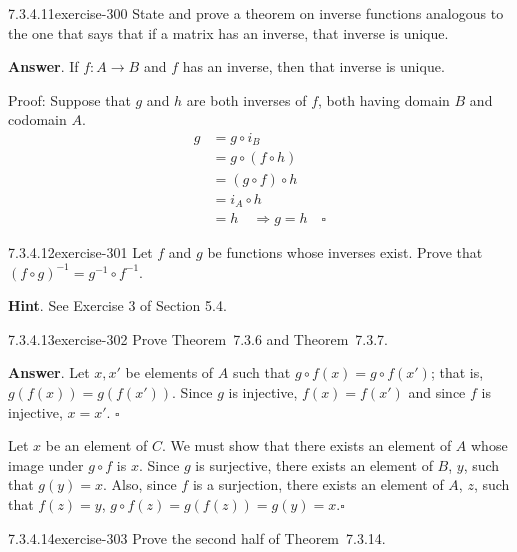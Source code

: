 \documentclass[twoside,10pt,]{book}
\numberwithin{equation}{section}
\begin{document}
\begin{divisionsolution}{7.3.4.11}{}{exercise-300}%
\hypertarget{p-2506}{}%
State and prove a theorem on inverse functions analogous to the one that says that if a matrix has an inverse, that inverse is unique.%
\par\smallskip%
\noindent\textbf{Answer}.\quad%
\hypertarget{p-2507}{}%
If \(f:A\to B\) and \(f\) has an inverse, then that inverse is unique.%
\par
\hypertarget{p-2508}{}%
Proof:  Suppose that \(g\) and \(h\) are both inverses of \(f\), both having domain \(B\) and codomain \(A\).%
\begin{equation*}
\begin{split}g &= g\circ i_B \\
& =g\circ (f\circ h)\\
& =(g\circ f)\circ h\\
& =i_A\circ h\\
& =h\quad \Rightarrow g=h \quad \square
\end{split}
\end{equation*}
%
\end{divisionsolution}%
\begin{divisionsolution}{7.3.4.12}{}{exercise-301}%
\hypertarget{p-2509}{}%
Let \(f\) and \(g\) be functions whose inverses exist. Prove that \((f\circ g)^{-1}= g^{-1}\circ f^{-1}\).%
\par\smallskip%
\noindent\textbf{Hint}.\quad%
\hypertarget{p-2510}{}%
See Exercise 3 of Section 5.4.%
\end{divisionsolution}%
\begin{divisionsolution}{7.3.4.13}{}{exercise-302}%
\hypertarget{p-2511}{}%
Prove Theorem~7.3.6 and Theorem~7.3.7.%
\par\smallskip%
\noindent\textbf{Answer}.\quad%
\hypertarget{p-2512}{}%
Let \(x,x'\) be elements of \(A\) such that \(g\circ f(x)=g\circ f(x')\); that is, \(g(f(x))=g(f(x'))\). Since \(g\) is injective, \(f(x)=f(x')\) and since \(f\) is injective, \(x=x'\). \(\square\)%
\par
\hypertarget{p-2513}{}%
Let \(x\) be an element of \(C\). We must show that there exists an element of \(A\) whose image under \(g\circ f\) is \(x\). Since \(g\) is surjective, there exists an element of \(B\), \(y\), such that \(g(y)=x\). Also, since \(f\) is a surjection, there exists an element of \(A\), \(z\), such that \(f(z)=y\), \(g\circ f(z)=g(f(z))=g(y)=x\).\(\square\)%
\end{divisionsolution}%
\begin{divisionsolution}{7.3.4.14}{}{exercise-303}%
\hypertarget{p-2514}{}%
Prove the second half of Theorem~7.3.14.%
\end{divisionsolution}%
\end{document}
